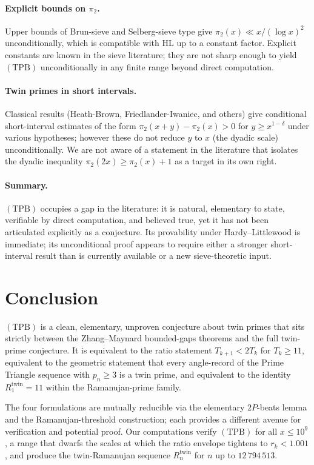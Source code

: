 \documentclass[11pt]{article}
\begin{document}
\paragraph{Explicit bounds on $\pi_2$.}
Upper bounds of Brun-sieve and Selberg-sieve type give
$\pi_2(x)\ll x/(\log x)^2$ unconditionally, which is compatible with
HL up to a constant factor. Explicit constants are known in the sieve
literature; they are not sharp enough to yield $(\mathrm{TPB})$
unconditionally in any finite range beyond direct computation.

\paragraph{Twin primes in short intervals.}
Classical results (Heath-Brown, Friedlander-Iwaniec, and others)
give conditional short-interval estimates of the form
$\pi_2(x+y)-\pi_2(x)>0$ for $y\ge x^{1-\delta}$ under various
hypotheses; however these do not reduce $y$ to $x$ (the dyadic scale)
unconditionally. We are not aware of a statement in the literature
that isolates the dyadic inequality $\pi_2(2x)\ge\pi_2(x)+1$ as a
target in its own right.

\paragraph{Summary.}
$(\mathrm{TPB})$ occupies a gap in the literature: it is natural,
elementary to state, verifiable by direct computation, and believed
true, yet it has not been articulated explicitly as a conjecture.
Its provability under Hardy--Littlewood is immediate; its
unconditional proof appears to require either a stronger
short-interval result than is currently available or a new
sieve-theoretic input.

\section{Conclusion}

$(\mathrm{TPB})$ is a clean, elementary, unproven conjecture about
twin primes that sits strictly between the Zhang--Maynard
bounded-gaps theorems and the full twin-prime conjecture. It is
equivalent to the ratio statement $T_{k+1}<2T_k$ for $T_k\ge 11$,
equivalent to the geometric statement that every angle-record
of the Prime Triangle sequence with $p_n\ge 3$ is a twin prime,
and equivalent to the identity $R^{\mathrm{twin}}_1=11$ within the
Ramanujan-prime family.

The four formulations are mutually reducible via the elementary
$2P$-beats lemma and the Ramanujan-threshold construction; each
provides a different avenue for verification and potential proof.
Our computations verify $(\mathrm{TPB})$ for all $x\le 10^9$, a range
that dwarfs the scales at which the ratio envelope tightens to
$r_k<1.001$, and produce the twin-Ramanujan sequence
$R^{\mathrm{twin}}_n$ for $n$ up to $12\,794\,513$.
\end{document}
